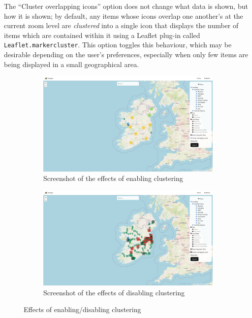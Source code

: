 \documentclass[a4paper,11pt]{report}
\begin{document}
The ``Cluster overlapping icons'' option does not change what data is shown, but how it is shown;
by default, any items whose icons overlap one another's at the current zoom level are \textit{clustered} into a single icon that displays the number of items which are contained within it using a Leaflet plug-in called \verb|Leaflet.markercluster|\supercite{leaflet_markercluster}.
This option toggles this behaviour, which may be desirable depending on the user's preferences, especially when only few items are being displayed in a small geographical area. 

\begin{figure}[H]
    \centering
    \begin{subfigure}[c]{0.49\textwidth}
        \centering
        \includegraphics[width=\textwidth]{./images/clusteringenabled.png}
        \caption{Screenshot of the effects of enabling clustering}
    \end{subfigure}
    \hfill
    \begin{subfigure}[c]{0.49\textwidth}
        \centering
        \includegraphics[width=\textwidth]{./images/clusteringdisabled.png}
        \caption{Screenshot of the effects of disabling clustering}
    \end{subfigure}
    \caption{Effects of enabling/disabling clustering}
\end{figure}
\end{document}
